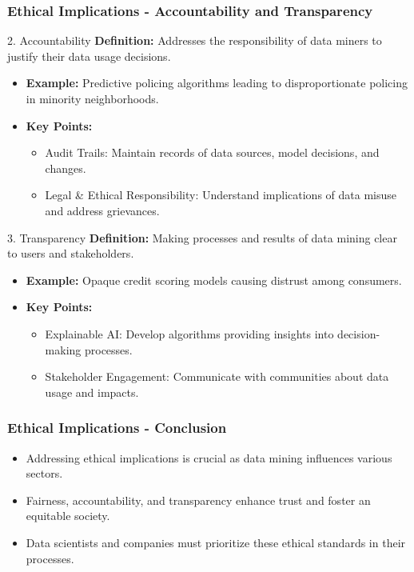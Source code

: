 \documentclass[aspectratio=169]{beamer}
\begin{document}
\begin{frame}[fragile]
    \frametitle{Ethical Implications - Accountability and Transparency}
    \begin{block}{2. Accountability}
        \textbf{Definition:} Addresses the responsibility of data miners to justify their data usage decisions.
    \end{block}
    \begin{itemize}
        \item \textbf{Example:} Predictive policing algorithms leading to disproportionate policing in minority neighborhoods.
        
        \item \textbf{Key Points:}
        \begin{itemize}
            \item Audit Trails: Maintain records of data sources, model decisions, and changes.
            \item Legal \& Ethical Responsibility: Understand implications of data misuse and address grievances.
        \end{itemize}
    \end{itemize}
    
    \begin{block}{3. Transparency}
        \textbf{Definition:} Making processes and results of data mining clear to users and stakeholders.
    \end{block}
    \begin{itemize}
        \item \textbf{Example:} Opaque credit scoring models causing distrust among consumers.
        
        \item \textbf{Key Points:}
        \begin{itemize}
            \item Explainable AI: Develop algorithms providing insights into decision-making processes.
            \item Stakeholder Engagement: Communicate with communities about data usage and impacts.
        \end{itemize}
    \end{itemize}
\end{frame}

\begin{frame}[fragile]
    \frametitle{Ethical Implications - Conclusion}
    \begin{itemize}
        \item Addressing ethical implications is crucial as data mining influences various sectors.
        \item Fairness, accountability, and transparency enhance trust and foster an equitable society.
        \item Data scientists and companies must prioritize these ethical standards in their processes.
    \end{itemize}
\end{frame}
\end{document}
